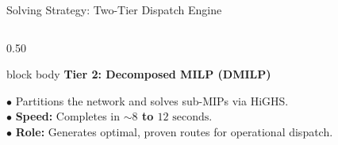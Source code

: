\documentclass[aspectratio=169,10pt]{beamer}
\begin{document}
\begin{frame}{Solving Strategy: Two-Tier Dispatch Engine}
\begin{columns}[T,totalwidth=\textwidth]
\begin{column}{0.50\textwidth}
        \vspace{0.12cm}

        \begin{beamercolorbox}[rounded=true,shadow=false,wd=\linewidth,sep=4pt]{block body}
            {\bfseries\color{Accent}\scriptsize Tier 2: Decomposed MILP (DMILP)}\par\vspace{0.02cm}
            \scriptsize
            $\bullet$ Partitions the network and solves sub-MIPs via HiGHS.\\
            $\bullet$ \textbf{Speed:} Completes in \textbf{$\sim 8$ to $12\text{ seconds}$}.\\
            $\bullet$ \textbf{Role:} Generates optimal, proven routes for operational dispatch.
        \end{beamercolorbox}
    \end{column}
\end{columns}

\vfill
\end{frame}

\end{document}
